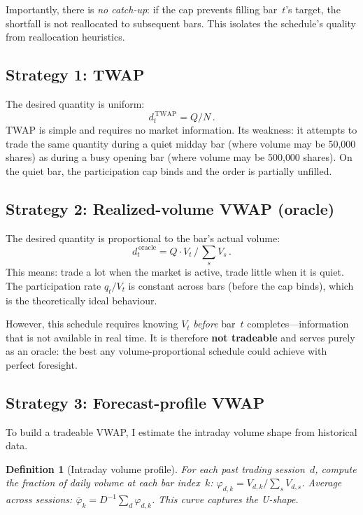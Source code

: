 \documentclass[10pt,twocolumn]{article}
\newtheorem{definition}{Definition}
\begin{document}
Importantly, there is \emph{no catch-up}: if the cap prevents filling bar~$t$'s target, the shortfall is not reallocated to subsequent bars. This isolates the schedule's quality from reallocation heuristics.

\subsection{Strategy 1: TWAP}

The desired quantity is uniform:
\begin{equation}
d_t^{\,\text{TWAP}} = Q / N\,.
\end{equation}
TWAP is simple and requires no market information. Its weakness: it attempts to trade the same quantity during a quiet midday bar (where volume may be 50{,}000 shares) as during a busy opening bar (where volume may be 500{,}000 shares). On the quiet bar, the participation cap binds and the order is partially unfilled.

\subsection{Strategy 2: Realized-volume VWAP (oracle)}

The desired quantity is proportional to the bar's actual volume:
\begin{equation}
d_t^{\,\text{oracle}} = Q \cdot V_t \,/\, {\textstyle\sum_s V_s}\,.
\end{equation}
This means: trade a lot when the market is active, trade little when it is quiet. The participation rate $q_t / V_t$ is constant across bars (before the cap binds), which is the theoretically ideal behaviour.

However, this schedule requires knowing $V_t$ \emph{before} bar~$t$ completes---information that is not available in real time. It is therefore \textbf{not tradeable} and serves purely as an oracle: the best any volume-proportional schedule could achieve with perfect foresight.

\subsection{Strategy 3: Forecast-profile VWAP}

To build a tradeable VWAP, I estimate the intraday volume shape from historical data.

\begin{definition}[Intraday volume profile]
For each past trading session~$d$, compute the fraction of daily volume at each bar index~$k$: $\varphi_{d,k} = V_{d,k}/\sum_s V_{d,s}$. Average across sessions: $\bar\varphi_k = D^{-1}\sum_d \varphi_{d,k}$. This curve captures the U-shape.
\end{definition}
\end{document}
